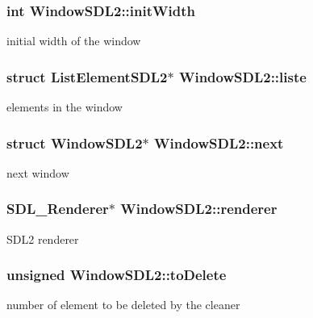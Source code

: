 \subsubsection[{\texorpdfstring{init\+Width}{initWidth}}]{\setlength{\rightskip}{0pt plus 5cm}int Window\+S\+D\+L2\+::init\+Width}\hypertarget{structWindowSDL2_ab6f213858040a055c371f947c4a71fca}{}\label{structWindowSDL2_ab6f213858040a055c371f947c4a71fca}
initial width of the window 
\subsubsection[{\texorpdfstring{liste}{liste}}]{\setlength{\rightskip}{0pt plus 5cm}struct {\bf List\+Element\+S\+D\+L2}$\ast$ Window\+S\+D\+L2\+::liste}\hypertarget{structWindowSDL2_a0d2c95e19f6936b1487d21317fda92ed}{}\label{structWindowSDL2_a0d2c95e19f6936b1487d21317fda92ed}
elements in the window 
\subsubsection[{\texorpdfstring{next}{next}}]{\setlength{\rightskip}{0pt plus 5cm}struct {\bf Window\+S\+D\+L2}$\ast$ Window\+S\+D\+L2\+::next}\hypertarget{structWindowSDL2_a9f377dedae284ebaedb2d4c4702737ea}{}\label{structWindowSDL2_a9f377dedae284ebaedb2d4c4702737ea}
next window 
\subsubsection[{\texorpdfstring{renderer}{renderer}}]{\setlength{\rightskip}{0pt plus 5cm}S\+D\+L\+\_\+\+Renderer$\ast$ Window\+S\+D\+L2\+::renderer}\hypertarget{structWindowSDL2_ae0ce53a825d290b40b3bd8db8c433db3}{}\label{structWindowSDL2_ae0ce53a825d290b40b3bd8db8c433db3}
S\+D\+L2 renderer 
\subsubsection[{\texorpdfstring{to\+Delete}{toDelete}}]{\setlength{\rightskip}{0pt plus 5cm}unsigned Window\+S\+D\+L2\+::to\+Delete}\hypertarget{structWindowSDL2_a83f3e9f38d1171818525f22fc7b32080}{}\label{structWindowSDL2_a83f3e9f38d1171818525f22fc7b32080}
number of element to be deleted by the cleaner 
